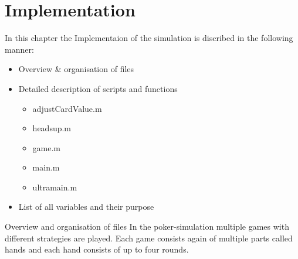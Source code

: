 \documentclass[11pt]{article}
\begin{document}
\section{Implementation}
In this chapter the Implementaion of the simulation is discribed in the following manner:
\begin{itemize}
\item Overview \& organisation of files
\item Detailed description of scripts and functions
    \begin{itemize}
    	\item adjustCardValue.m
        \item headsup.m
        \item game.m
        \item main.m
        \item ultramain.m
    \end{itemize}
\item List of all variables and their purpose
\end{itemize}

Overview and organisation of files 
In the poker-simulation multiple games with different strategies are played. Each game consists again of multiple parts called hands and each hand consists of up to four rounds.
\end{document}
